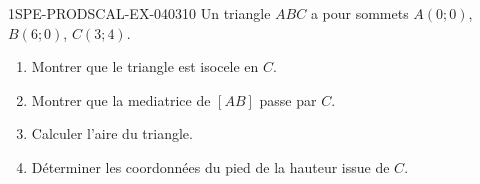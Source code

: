 \begin{exercice}{1SPE-PRODSCAL-EX-040}{3}{10}
Un triangle $ABC$ a pour sommets $A(0; 0)$, $B(6; 0)$, $C(3; 4)$.
\begin{enumerate}
  \item Montrer que le triangle est isocele en $C$.
  \item Montrer que la mediatrice de $[AB]$ passe par $C$.
  \item Calculer l'aire du triangle.
  \item Déterminer les coordonnées du pied de la hauteur issue de $C$.
\end{enumerate}
\end{exercice}
